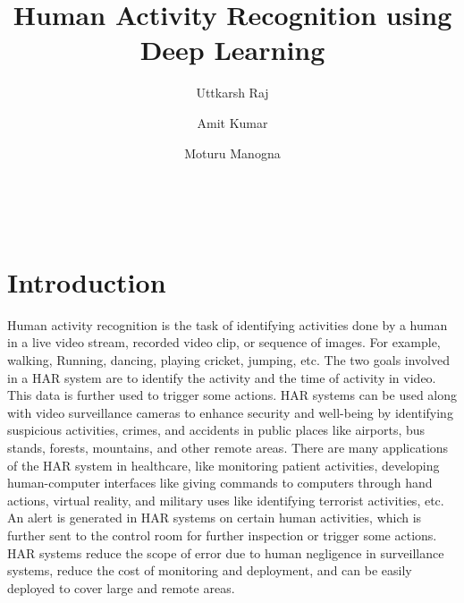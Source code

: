 \documentclass[twocolumn]{article}
\begin{document}
\title{\textbf{Human Activity Recognition using Deep Learning}}\\


\author{Uttkarsh Raj \and Amit Kumar \and Moturu Manogna}





\section{Introduction}
Human activity recognition is the task of identifying activities done by a human in a live video stream, recorded video clip, or sequence of images. For example, walking, 
Running, dancing, playing cricket, jumping, etc. The two goals involved in a HAR system are to identify the activity and the time of activity in video. This data is 
further used to trigger some actions. HAR systems can be used along with video surveillance cameras to enhance security and well-being by identifying suspicious 
activities, crimes, and accidents in public places like airports, bus stands, forests, mountains, and other remote areas. There are many applications of the HAR 
system in healthcare, like monitoring patient activities, developing human-computer interfaces like giving commands to computers through hand actions, virtual reality, 
and military uses like identifying terrorist activities, etc. An alert is generated in HAR systems on certain human activities, which is further sent to the control room 
for further inspection or trigger some actions. HAR systems reduce the scope of error due to human negligence in surveillance systems, reduce the cost of monitoring 
and deployment, and can be easily deployed to cover large and remote areas. \\
\end{document}
